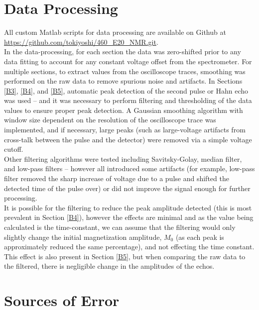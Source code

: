 \section{Data Processing} \label{append:process}

All custom Matlab scripts for data processing are available on Github at \url{https://github.com/tokiyoshi/460_E20_NMR.git}.\\

In the data-processing, for each section the data was zero-shifted prior to any data fitting to account for any constant voltage offset from the spectrometer. For multiple sections, to extract values from the oscilloscope traces, smoothing was performed on the raw data to remove spurious noise and artifacts. In Sections \ref{B3}, \ref{B4}, and \ref{B5}, automatic peak detection of the second pulse or Hahn echo was used -- and it was necessary to perform filtering and thresholding of the data values to ensure proper peak detection. A Gaussian smoothing algorithm with window size dependent on the resolution of the oscilloscope trace was implemented, and if necessary, large peaks (such as large-voltage artifacts from cross-talk between the pulse and the detector) were removed via a simple voltage cutoff. \\

Other filtering algorithms were tested including Savitsky-Golay, median filter, and low-pass filters -- however all introduced some artifacts (for example, low-pass filter removed the sharp increase of voltage due to a pulse and shifted the detected time of the pulse over) or did not improve the signal enough for further processing. \\

It is possible for the filtering to reduce the peak amplitude detected (this is most prevalent in Section \ref{B4}), however the effects are minimal and as the value being calculated is the time-constant, we can assume that the filtering would only slightly change the initial magnetization amplitude, $M_0$ (as each peak is approximately reduced the same percentage), and not effecting the time constant. This effect is also present in Section \ref{B5}, but when comparing the raw data to the filtered, there is negligible change in the amplitudes of the echos.

\section{Sources of Error} \label{append:error}

